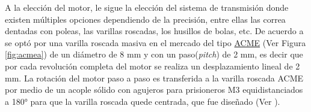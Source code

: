 A la elección del motor, le sigue la elección del sistema de transmisión donde existen múltiples opciones dependiendo de la precisión, entre ellas las correa dentadas con poleas, las varillas roscadas, los husillos de bolas, etc. De acuerdo a \cite{schaa} se optó por una varilla roscada masiva en el mercado del tipo \href{https://www.mcmaster.com/acme-screws/acme-lead-screws-and-nuts/}{ACME} (Ver Figura \ref{fig:acmea}) de un diámetro de 8 mm y con un paso(\textit{pitch}) de 2 mm, es decir que por cada revolución completa del motor se realiza un desplazamiento lineal de 2 mm. La rotación del motor paso a paso es transferida a la varilla roscada ACME por medio de un acople sólido con agujeros para prisioneros M3 equidistanciados a 180° para que la varilla roscada quede centrada, que fue diseñado (Ver \href{https://github.com/jrr1984/open_frame_XYStage/blob/master/3dprintedparts/STLs/acopleRIGIDO.STL}{\faCubes}).
\begin{figure}[H]
	\begin{floatrow}
	\end{floatrow}
\end{figure}

